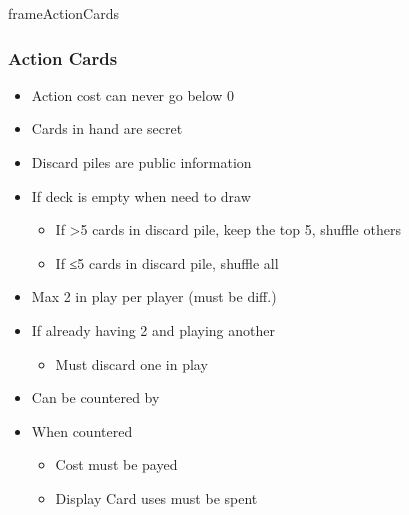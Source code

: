 \documentclass[10pt]{article}
\begin{document}
\begin{dynamiccontents*}{frameActionCards}
	\subsubsection*{Action Cards }
	\begin{itemize}
		\item Action cost can never go below 0
		\item Cards in hand are secret
		\item Discard piles are public information
		\item If deck is empty when need to draw 
		\begin{itemize}
			\item If >5 cards in discard pile, keep the top 5, shuffle others
			\item If ≤5 cards in discard pile, shuffle all
		\end{itemize}
	\end{itemize}
	\begin{itemize}
		\item Max 2 in play per player (must be diff.)
		\item If already having 2 and playing another
		\begin{itemize}
			\item Must discard one in play
		\end{itemize}
	\end{itemize}
	\begin{itemize}
		\item Can be countered by 
		\item When countered
		\begin{itemize}
			\item Cost must be payed
			\item Display Card uses must be spent
		\end{itemize}
	\end{itemize}
\end{dynamiccontents*}
\end{document}

